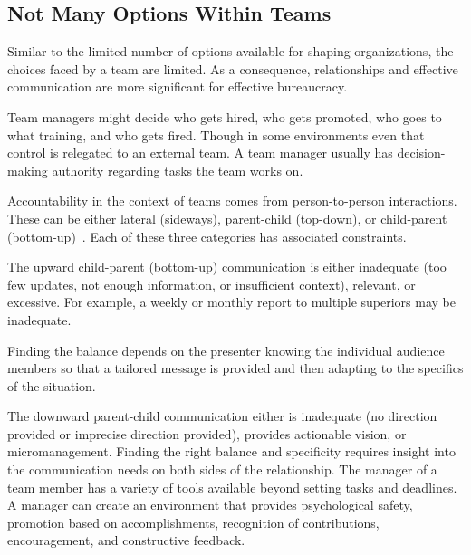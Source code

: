 




\subsection*{Not Many Options Within Teams}



Similar to the limited number of options available for shaping organizations, the choices faced by a team are limited. 
As a consequence, relationships and effective communication are more significant for effective bureaucracy. 


Team managers might decide who gets hired, who gets promoted, who goes to what training, and who gets fired. Though in some environments even that control is relegated to an external team. A team manager usually has decision-making authority regarding tasks the team works on. 


Accountability in the context of teams comes from person-to-person interactions. These can be either lateral (sideways), parent-child (top-down), or child-parent (bottom-up)~\cite{2014_Jorgensen}. Each of these three categories has associated constraints.

The upward child-parent (bottom-up) communication is either inadequate (too few updates, not enough information, or insufficient context), relevant, or excessive. For example, a weekly or monthly report to multiple superiors may be inadequate. 

Finding the balance depends on the presenter knowing the individual audience members so that a tailored message is provided and then adapting to the specifics of the situation. 

The downward parent-child communication either is inadequate (no direction provided or imprecise direction provided), provides actionable vision, or micromanagement. Finding the right balance and specificity requires insight into the communication needs on both sides of the relationship. The manager of a team member has a variety of tools available beyond setting tasks and deadlines. A manager can create an environment that provides psychological safety, promotion based on accomplishments, recognition of contributions, encouragement, and constructive feedback.

